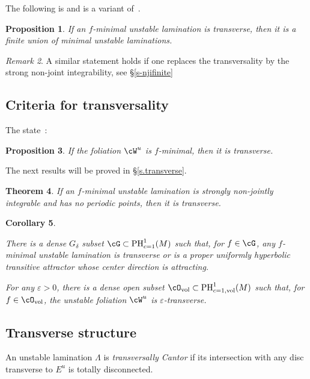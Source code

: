 \documentclass[a4paper,11pt]{amsart}
\numberwithin{equation}{section}     %
\newtheorem{teo}{Theorem}[section]
\newtheorem{cor}[teo]{Corollary}
\newtheorem{prop}[teo]{Proposition}
\theoremstyle{definition}
\theoremstyle{remark}
\newtheorem{obs}[teo]{Remark}
\DeclareMathOperator{\PH}{PH}
\begin{document}
The following is \cite[Proposition 1.5]{ACW} and is a variant of~\cite{CPoS}.

\begin{prop}\label{prop-njifinite}
If an $f$-minimal unstable lamination is transverse, then it is a finite union of minimal unstable laminations. 
\end{prop}

\begin{obs}\label{r-njifinite}
A similar statement holds if one replaces the transversality by the strong non-joint integrability, see \S\ref{s-njifinite}
\end{obs}


\subsection{Criteria for transversality}
The state~\cite[Proposition 1.4]{ACW}:
\begin{prop}\label{p.transverse0}
If the foliation $\cW^u$ is $f$-minimal, then it is transverse.
\end{prop}

The next results will be proved in \S\ref{s.transverse}.  

\begin{teo}\label{t.transverse-periodic}
If an $f$-minimal unstable lamination is strongly non-jointly integrable and has no periodic points, then it is transverse. 
\end{teo}

\begin{cor}\label{C.QAorTrans}

There is a dense $G_\delta$ subset $\cG\subset \PH^1_{c=1}(M)$ such that, for $f \in \cG$, any $f$-minimal unstable lamination is transverse or is a proper uniformly hyperbolic transitive attractor whose center direction is attracting.

For any $\varepsilon>0$, there is a dense open subset $\cO_{\mathrm{vol}} \subset \PH^1_{c=1, \mathrm{vol}}(M)$ such that, for $f \in \cO_{\mathrm{vol}}$, the unstable foliation $\cW^u$ is $\varepsilon$-transverse. 
\end{cor}

\subsection{Transverse structure} 

An unstable lamination $\Lambda$ is \emph{trans\-versally Cantor} if
its intersection with any disc transverse to $E^u$ is totally disconnected. 
\end{document}
